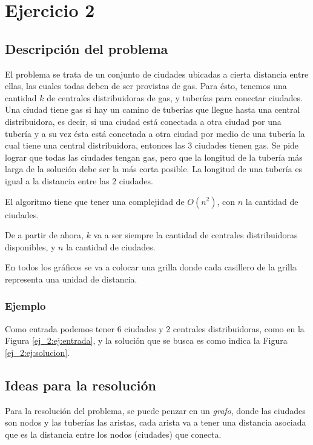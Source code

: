 \section{Ejercicio 2}

\subsection{Descripci\'on del problema} \label{ej_2:descripcion}

El problema se trata de un conjunto de ciudades ubicadas a cierta distancia entre ellas, las cuales todas deben de ser provistas de gas.
Para \'esto, tenemos una cantidad $k$ de centrales distribuidoras de gas, y tuber\'ias para conectar ciudades.
Una ciudad tiene gas si hay un camino de tuber\'ias que llegue hasta una central distribuidora, es decir,
si una ciudad est\'a conectada a otra ciudad por una tuber\'ia y a su vez \'esta est\'a conectada a otra ciudad
por medio de una tuber\'ia la cual tiene una central distribuidora, entonces las 3 ciudades tienen gas.
Se pide lograr que todas las ciudades tengan gas, pero que la longitud de la tuber\'ia m\'as larga de la soluci\'on
debe ser la m\'as corta posible. La longitud de una tuber\'ia es igual a la distancia entre las 2 ciudades.

El algoritmo tiene que tener una complejidad de $O(n^2)$, con $n$ la cantidad de ciudades.

De a partir de ahora, $k$ va a ser siempre la cantidad de centrales distribuidoras disponibles, y $n$ la cantidad de ciudades.

En todos los gr\'aficos se va a colocar una grilla donde cada casillero de la grilla representa una unidad de distancia.

\subsubsection{Ejemplo}

Como entrada podemos tener 6 ciudades y 2 centrales distribuidoras, como en la Figura \ref{ej_2:ej:entrada}, y la soluci\'on que se busca es como indica la Figura \ref{ej_2:ej:solucion}.



\subsection{Ideas para la resoluci\'on} \label{ej_2:idea}

Para la resoluci\'on del problema, se puede penzar en un \emph{grafo}, donde las ciudades son nodos y las tuber\'ias las aristas,
cada arista va a tener una distancia asociada que es la distancia entre los nodos (ciudades) que conecta.

